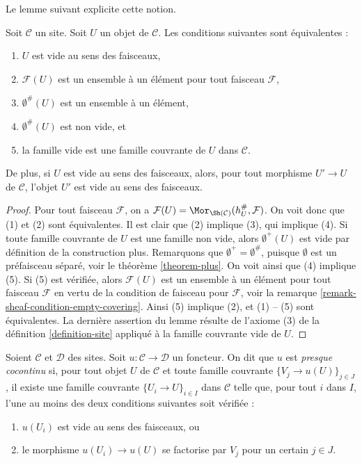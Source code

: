 \noindent
Le lemme suivant explicite cette notion.

\begin{lemma}
\label{lemma-characterize-empty}
Soit $\mathcal{C}$ un site. Soit $U$ un objet de $\mathcal{C}$.
Les conditions suivantes sont équivalentes :
\begin{enumerate}
\item $U$ est vide au sens des faisceaux,
\item $\mathcal{F}(U)$ est un ensemble à un élément pour tout faisceau $\mathcal{F}$,
\item $\emptyset^\#(U)$ est un ensemble à un élément,
\item $\emptyset^\#(U)$ est non vide, et
\item la famille vide est une famille couvrante de $U$ dans $\mathcal{C}$.
\end{enumerate}
De plus, si $U$ est vide au sens des faisceaux, alors, pour tout morphisme
$U' \to U$ de $\mathcal{C}$, l’objet $U'$ est vide au sens des faisceaux.
\end{lemma}

\begin{proof}
Pour tout faisceau $\mathcal{F}$, on a
$\mathcal{F}(U) = \Mor_{\Sh(\mathcal{C})}(h_U^\#, \mathcal{F})$.
On voit donc que (1) et (2) sont équivalentes.
Il est clair que (2) implique (3), qui implique (4).
Si toute famille couvrante de $U$ est une famille non vide,
alors $\emptyset^+(U)$ est vide par définition de la construction plus.
Remarquons que $\emptyset^+ = \emptyset^\#$, puisque $\emptyset$ est un
préfaisceau séparé, voir le
théorème \ref{theorem-plus}.
On voit ainsi que (4) implique (5). Si (5) est vérifiée, alors
$\mathcal{F}(U)$ est un ensemble à un élément pour tout faisceau $\mathcal{F}$
en vertu de la condition de faisceau pour $\mathcal{F}$, voir la
remarque \ref{remark-sheaf-condition-empty-covering}.
Ainsi (5) implique (2), et (1) -- (5) sont équivalentes. La dernière
assertion du lemme résulte de l’axiome (3) de la
définition \ref{definition-site}
appliqué à la famille couvrante vide de $U$.
\end{proof}

\begin{definition}
\label{definition-almost-cocontinuous}
Soient $\mathcal{C}$ et $\mathcal{D}$ des sites.
Soit $u : \mathcal{C} \to \mathcal{D}$ un foncteur.
On dit que $u$ est {\it presque cocontinu} si, pour tout
objet $U$ de $\mathcal{C}$ et toute famille couvrante
$\{V_j \to u(U)\}_{j \in J}$, il existe une famille couvrante
$\{U_i \to U\}_{i \in I}$ dans $\mathcal{C}$ telle que,
pour tout $i$ dans $I$, l’une au moins des deux conditions suivantes soit vérifiée :
\begin{enumerate}
\item $u(U_i)$ est vide au sens des faisceaux, ou
\item le morphisme $u(U_i) \to u(U)$ se factorise par $V_j$ pour un certain $j \in J$.
\end{enumerate}
\end{definition}

